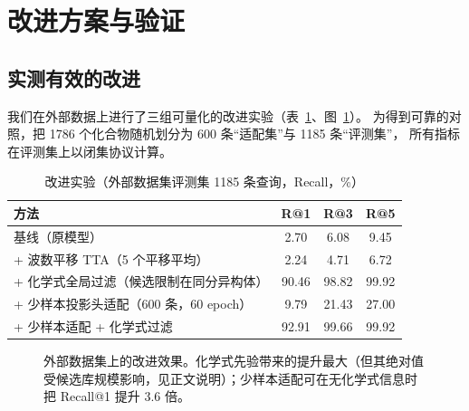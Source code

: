 \documentclass[UTF8,a4paper,11pt]{ctexart}
\begin{document}
\section{改进方案与验证}
\label{sec:improve}

\subsection{实测有效的改进}
我们在外部数据上进行了三组可量化的改进实验（表~\ref{tab:improve}、图~\ref{fig:improve}）。
为得到可靠的对照，把 1786 个化合物随机划分为 600 条“适配集”与 1185 条“评测集”，
所有指标在评测集上以闭集协议计算。

\begin{table}[H]
\centering\small
\caption{改进实验（外部数据集评测集 1185 条查询，Recall，\%）}
\label{tab:improve}
\begin{tabular}{@{}lccc@{}}
\toprule
方法 & R@1 & R@3 & R@5\\
\midrule
基线（原模型） & 2.70 & 6.08 & 9.45\\
+ 波数平移 TTA（5 个平移平均） & 2.24 & 4.71 & 6.72\\
+ 化学式全局过滤（候选限制在同分异构体） & 90.46 & 98.82 & 99.92\\
+ 少样本投影头适配（600 条，60 epoch） & 9.79 & 21.43 & 27.00\\
+ 少样本适配 + 化学式过滤 & 92.91 & 99.66 & 99.92\\
\bottomrule
\end{tabular}
\end{table}

\begin{figure}[H]
\centering
{}
\caption{外部数据集上的改进效果。化学式先验带来的提升最大（但其绝对值受候选库规模影响，见正文说明）；少样本适配可在无化学式信息时把 Recall@1 提升 3.6 倍。}
\label{fig:improve}
\end{figure}
\end{document}
